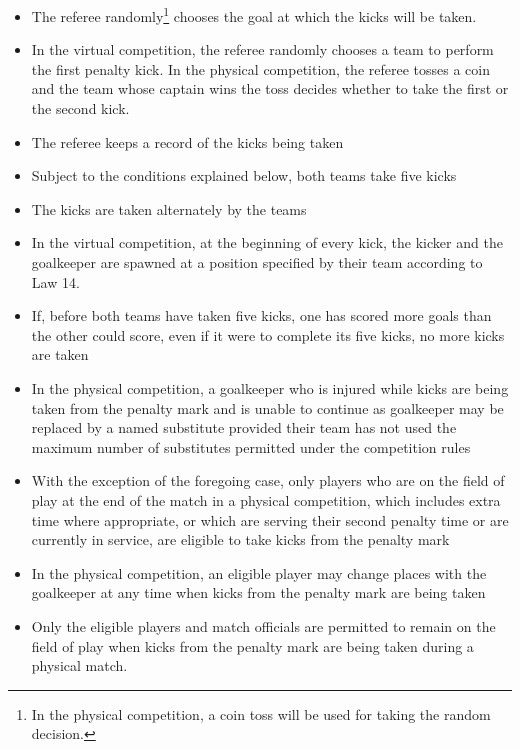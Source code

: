 \begin{itemize}
\item The referee randomly\footnote{In the physical competition, a coin toss will be used for taking the random decision.} chooses the goal at which the kicks will be taken.
\item In the virtual competition, the referee randomly chooses a team to perform the first penalty kick. In the physical competition, the referee tosses a coin and the team whose captain wins the toss decides whether to take the first or the second kick.
\item The referee keeps a record of the kicks being taken 
\item Subject to the conditions explained below, both teams take five kicks 
\item The kicks are taken alternately by the teams 
\item In the virtual competition, at the beginning of every kick, the kicker and the goalkeeper are spawned at
    a position specified by their team according to Law 14.
\item If, before both teams have taken five kicks, one has scored more goals than the other could score, even if it were to complete its five kicks, no more kicks are taken
\item In the physical competition, a goalkeeper who is injured while kicks are being taken from the penalty mark and is unable to continue as goalkeeper may be replaced by a named substitute provided their team has not used the maximum number of substitutes permitted under the competition rules
\item With the exception of the foregoing case,
      only players who are on the field of play at the end of the match in a physical competition,
      which includes extra time where appropriate,
      or which are serving their  second penalty time or are currently in service,
      are eligible to take kicks from the penalty mark

\item In the physical competition, an eligible player may change places with the goalkeeper at any time when kicks from the penalty mark are being taken
\item Only the eligible players and match officials are permitted to
    remain on the field of play when kicks from the penalty mark are being
    taken during a physical match.


\end{itemize}
